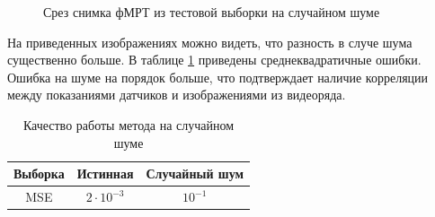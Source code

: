 \documentclass[12pt,twoside]{article}
\begin{document}
\begin{figure}[h!]
    \centering
    \hfill
    \hfill
    \caption{Срез снимка фМРТ из тестовой выборки на случайном шуме}
    \label{fig:8}
\end{figure}
На приведенных изображениях можно видеть, что разность в случе шума существенно больше.
В таблице \ref{table_3} приведены среднеквадратичные ошибки.
Ошибка на шуме на порядок больше, что подтверждает наличие корреляции между показаниями датчиков и изображениями из видеоряда.
\begin{table}[h!]
    \centering
    \begin{tabular}{|c|c|c|}
        \hline
        Выборка	&	Истинная	&	Случайный шум \\ \hline \hline
        MSE		& 	$2 \cdot 10^{-3}$	 &		$10^{-1}$ \\ \hline
    \end{tabular}
    \caption{Качество работы метода на случайном шуме}
    \label{table_3}
\end{table}
\end{document}
